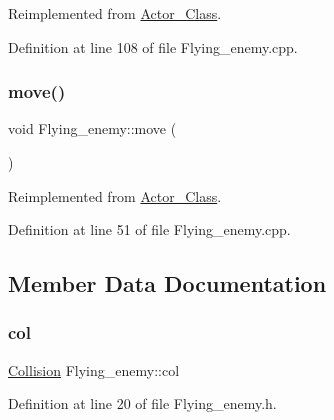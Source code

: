 Reimplemented from \hyperlink{class_actor___class_ab33216a3ce0c856bdc16231c71ae35c2}{Actor\+\_\+\+Class}.



Definition at line 108 of file Flying\+\_\+enemy.\+cpp.

\hypertarget{class_flying__enemy_a0b55c3bf770b7f94fa6892cac47c80bd}{}\label{class_flying__enemy_a0b55c3bf770b7f94fa6892cac47c80bd} 
\subsubsection{\texorpdfstring{move()}{move()}}
{\footnotesize\ttfamily void Flying\+\_\+enemy\+::move (\begin{DoxyParamCaption}{ }\end{DoxyParamCaption})\hspace{0.3cm}{\ttfamily [virtual]}}



Reimplemented from \hyperlink{class_actor___class_af1764a94c5410ba8476f56553cd2c327}{Actor\+\_\+\+Class}.



Definition at line 51 of file Flying\+\_\+enemy.\+cpp.



\subsection{Member Data Documentation}
\hypertarget{class_flying__enemy_a4fc05425448f4272839d9765f5f9e859}{}\label{class_flying__enemy_a4fc05425448f4272839d9765f5f9e859} 
\subsubsection{\texorpdfstring{col}{col}}
{\footnotesize\ttfamily \hyperlink{class_collision}{Collision} Flying\+\_\+enemy\+::col}



Definition at line 20 of file Flying\+\_\+enemy.\+h.

\hypertarget{class_flying__enemy_a4c36026231ab03d14c8b3429c026c2ad}{}\label{class_flying__enemy_a4c36026231ab03d14c8b3429c026c2ad} 

